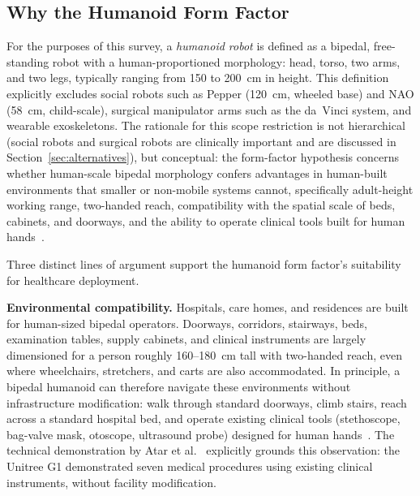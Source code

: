 \documentclass[acmsmall]{acmart}
\begin{document}
\subsection{Why the Humanoid Form Factor}
\label{sec:formfactor}

For the purposes of this survey, a \emph{humanoid robot} is defined as a
bipedal, free-standing robot with a human-proportioned morphology: head, torso,
two arms, and two legs, typically ranging from 150 to 200~cm in height. This
definition explicitly excludes social robots such as Pepper (120~cm, wheeled
base) and NAO (58~cm, child-scale), surgical manipulator arms such as the
da~Vinci system, and wearable exoskeletons. The rationale for this scope
restriction is not hierarchical (social robots and surgical robots are
clinically important and are discussed in Section~\ref{sec:alternatives}), but
conceptual: the form-factor hypothesis concerns whether human-scale bipedal
morphology confers advantages in human-built environments that smaller or
non-mobile systems cannot, specifically adult-height working range, two-handed
reach, compatibility with the spatial scale of beds, cabinets, and doorways, and
the ability to operate clinical tools built for human
hands~\cite{adams2000humanoid,duffy2003anthropomorphism}.

Three distinct lines of argument support the humanoid form factor's suitability
for healthcare deployment.

\textbf{Environmental compatibility.} Hospitals, care homes, and residences are
built for human-sized bipedal operators. Doorways, corridors, stairways, beds,
examination tables, supply cabinets, and clinical instruments are largely
dimensioned for a person roughly 160--180~cm tall with two-handed reach, even
where wheelchairs, stretchers, and carts are also accommodated. In principle, a
bipedal humanoid can therefore navigate these environments without infrastructure
modification: walk through standard doorways, climb stairs, reach across a
standard hospital bed, and operate existing clinical tools (stethoscope,
bag-valve mask, otoscope, ultrasound probe) designed for human
hands~\cite{adams2000humanoid,krotkov2018darpa}.
The
technical demonstration by Atar et al.~\cite{atar2025humanoids} explicitly grounds
this observation: the Unitree G1 demonstrated seven medical procedures using
existing clinical instruments, without facility modification.
\end{document}
